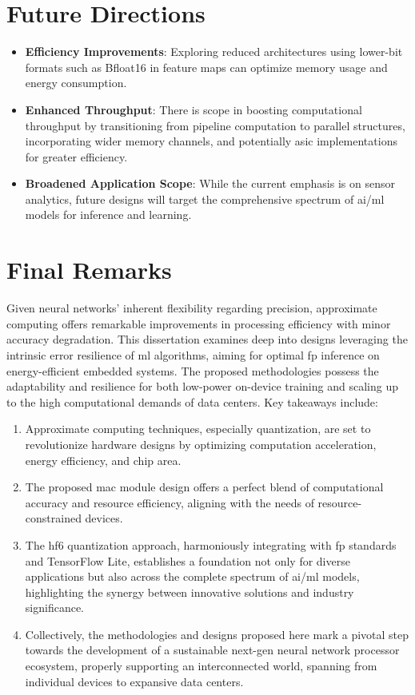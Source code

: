 \section{Future Directions}
\begin{itemize}
	\item \textbf{Efficiency Improvements}: Exploring reduced architectures using lower-bit formats such as Bfloat16 in feature maps can optimize memory usage and energy consumption.
	
	\item \textbf{Enhanced Throughput}: There is scope in boosting computational throughput by transitioning from pipeline computation to parallel structures, incorporating wider memory channels, and potentially \gls{asic} implementations for greater efficiency.
	
	\item \textbf{Broadened Application Scope}: While the current emphasis is on sensor analytics, future designs will target the comprehensive spectrum of \gls{ai}/\gls{ml} models for inference and learning.
\end{itemize}

\section{Final Remarks}
Given neural networks' inherent flexibility regarding precision, approximate computing offers remarkable improvements in processing efficiency with minor accuracy degradation. This dissertation examines deep into designs leveraging the intrinsic error resilience of \gls{ml} algorithms, aiming for optimal \gls{fp} inference on energy-efficient embedded systems. The proposed methodologies possess the adaptability and resilience for both low-power on-device training and scaling up to the high computational demands of data centers. Key takeaways include:

\begin{enumerate}
	\item Approximate computing techniques, especially quantization, are set to revolutionize hardware designs by optimizing computation acceleration, energy efficiency, and chip area.
	
	\item The proposed \gls{mac} module design offers a perfect blend of computational accuracy and resource efficiency, aligning with the needs of resource-constrained devices.
	
	
	\item The \gls{hf6} quantization approach, harmoniously integrating with \gls{fp} standards and TensorFlow Lite, establishes a foundation not only for diverse applications but also across the complete spectrum of \gls{ai}/\gls{ml} models, highlighting the synergy between innovative solutions and industry significance.
	
	\item Collectively, the methodologies and designs proposed here mark a pivotal step towards the development of a sustainable next-gen neural network processor ecosystem, properly supporting an interconnected world, spanning from individual devices to expansive data centers.
\end{enumerate}

